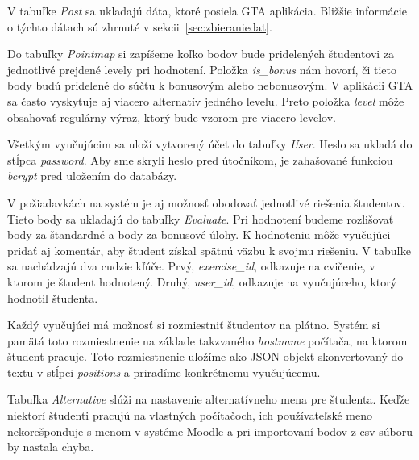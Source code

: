 V tabuľke \textit{Post} sa ukladajú dáta, ktoré posiela GTA aplikácia. Bližšie
informácie o týchto dátach sú zhrnuté v sekcii~\ref{sec:zbieraniedat}.

Do tabuľky \textit{Pointmap} si zapíšeme koľko bodov bude pridelených študentovi
za jednotlivé prejdené levely pri hodnotení. Položka \textit{is\_bonus} nám hovorí,
či tieto body budú pridelené do súčtu k bonusovým alebo nebonusovým. V aplikácii
GTA sa často vyskytuje aj viacero alternatív jedného levelu. Preto položka
\textit{level} môže obsahovať regulárny výraz, ktorý bude vzorom pre viacero
levelov.

Všetkým vyučujúcim sa uloží vytvorený účet do tabuľky \textit{User}.
Heslo sa ukladá do stĺpca \textit{password}. Aby sme skryli heslo pred útočníkom,
je zahašované funkciou \textit{bcrypt} pred uložením do databázy.

V požiadavkách na systém je aj možnosť obodovať jednotlivé riešenia študentov.
Tieto body sa ukladajú do tabuľky \textit{Evaluate}. Pri hodnotení budeme rozlišovať
body za štandardné a body za bonusové úlohy. K hodnoteniu môže vyučujúci pridať aj
komentár, aby študent získal spätnú väzbu k svojmu riešeniu. V tabuľke sa nachádzajú
dva cudzie kľúče. Prvý, \textit{exercise\_id}, odkazuje na cvičenie, v ktorom je študent
hodnotený. Druhý, \textit{user\_id}, odkazuje na vyučujúceho, ktorý hodnotil študenta.

Každý vyučujúci má možnosť si rozmiestniť študentov na plátno. Systém si
pamätá toto rozmiestnenie na základe takzvaného \textit{hostname} počítača,
na ktorom študent pracuje. Toto rozmiestnenie uložíme ako JSON objekt skonvertovaný
do textu v stĺpci \textit{positions} a priradíme konkrétnemu vyučujúcemu.

Tabuľka \textit{Alternative} slúži na nastavenie alternatívneho mena pre študenta.
Keďže niektorí študenti pracujú na vlastných počítačoch, ich používateľské meno
nekorešponduje s menom v systéme Moodle a pri importovaní bodov z csv súboru
by nastala chyba.

